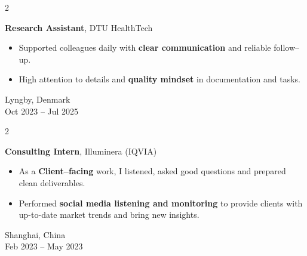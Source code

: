 \documentclass[10pt, letterpaper]{article}
\newenvironment{highlights}{
    \begin{itemize}[
        topsep=0.08 cm,
        parsep=0.08 cm,
        partopsep=0pt,
        itemsep=0pt,
        leftmargin=0.4 cm + 10pt
    ]
}{
    \end{itemize}
}
\newenvironment{twocolentry}[2][]{
    \onecolentry
    \def\secondColumn{#2}
    \setcolumnwidth{\fill, 4.5 cm}
    \begin{paracol}{2}
}{
    \switchcolumn \raggedleft \secondColumn
    \end{paracol}
    \endonecolentry
}
\begin{document}
    \vspace{0.18 cm}

    \begin{twocolentry}{
        Lyngby, Denmark\\
        Oct 2023 -- Jul 2025
    }
        \textbf{Research Assistant}, DTU HealthTech
        \begin{highlights}
            \item Supported colleagues daily with \textbf{clear communication} and reliable follow–up.
            \item High attention to details and \textbf{quality mindset} in documentation and tasks.
        \end{highlights}
    \end{twocolentry}

    \vspace{0.18 cm}

    \begin{twocolentry}{
        Shanghai, China\\
        Feb 2023 -- May 2023
    }
        \textbf{Consulting Intern}, Illuminera (IQVIA)
        \begin{highlights}
            \item As a \textbf{Client–facing} work, I listened, asked good questions and prepared clean deliverables.
            \item Performed \textbf{social media listening and monitoring} to provide clients with up-to-date market trends and bring new insights.
        \end{highlights}
    \end{twocolentry}

\end{document}
